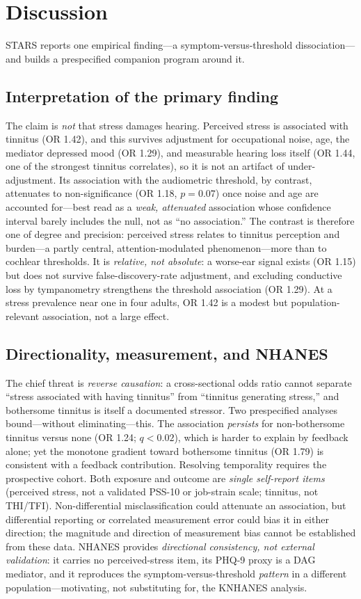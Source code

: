 \section{Discussion}
STARS reports one empirical finding---a symptom-versus-threshold dissociation---and
builds a prespecified companion program around it.

\subsection{Interpretation of the primary finding}
The claim is \emph{not} that stress damages hearing. Perceived stress is associated
with tinnitus (OR 1.42), and this survives adjustment for occupational noise, age,
the mediator depressed mood (OR 1.29), and measurable hearing loss itself (OR 1.44,
one of the strongest tinnitus correlates), so it is not an artifact of
under-adjustment. Its association with the audiometric threshold, by contrast,
attenuates to non-significance (OR 1.18, $p=0.07$) once noise and age are accounted
for---best read as a \emph{weak, attenuated} association whose confidence interval
barely includes the null, not as ``no association.'' The contrast is therefore one
of degree and precision: perceived stress relates to tinnitus perception and
burden---a partly central, attention-modulated phenomenon---more than to cochlear
thresholds. It is \emph{relative, not absolute}: a worse-ear signal exists (OR
1.15) but does not survive false-discovery-rate adjustment, and excluding
conductive loss by tympanometry strengthens the threshold association (OR 1.29). At
a stress prevalence near one in four adults, OR 1.42 is a modest but
population-relevant association, not a large effect.

\subsection{Directionality, measurement, and NHANES}
The chief threat is \emph{reverse causation}: a cross-sectional odds ratio cannot
separate ``stress associated with having tinnitus'' from ``tinnitus generating
stress,'' and bothersome tinnitus is itself a documented stressor. Two prespecified
analyses bound---without eliminating---this. The association \emph{persists} for
non-bothersome tinnitus versus none (OR 1.24; $q<0.02$), which is harder to explain
by feedback alone; yet the monotone gradient toward bothersome tinnitus (OR 1.79)
is consistent with a feedback contribution. Resolving temporality requires the
prospective cohort. Both exposure and outcome are \emph{single self-report items}
(perceived stress, not a validated PSS-10 or job-strain scale; tinnitus, not
THI/TFI). Non-differential misclassification could attenuate an association, but
differential reporting or correlated measurement error could bias it in either
direction; the magnitude and direction of measurement bias cannot be established
from these data.
NHANES provides \emph{directional consistency, not external validation}: it carries
no perceived-stress item, its PHQ-9 proxy is a DAG mediator, and it reproduces the
symptom-versus-threshold \emph{pattern} in a different population---motivating, not
substituting for, the KNHANES analysis.

